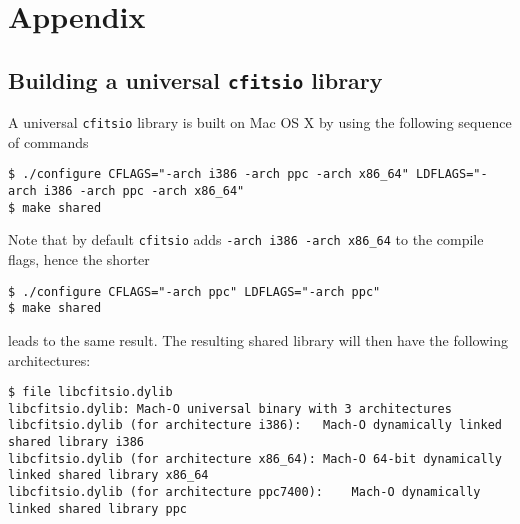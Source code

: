 \documentclass{article}[12pt,a4]
\begin{document}
\section{Appendix}

\subsection{Building a universal {\tt cfitsio} library}

A universal {\tt cfitsio} library is built on Mac OS X by using the following sequence of commands
{\small
\begin{verbatim}
$ ./configure CFLAGS="-arch i386 -arch ppc -arch x86_64" LDFLAGS="-arch i386 -arch ppc -arch x86_64"
$ make shared
\end{verbatim}}
Note that by default {\tt cfitsio} adds {\tt -arch i386 -arch x86\_64} to the compile flags, hence the shorter
{\small
\begin{verbatim}
$ ./configure CFLAGS="-arch ppc" LDFLAGS="-arch ppc"
$ make shared
\end{verbatim}}
leads to the same result.
The resulting shared library will then have the following architectures:
{\small
\begin{verbatim}
$ file libcfitsio.dylib
libcfitsio.dylib: Mach-O universal binary with 3 architectures
libcfitsio.dylib (for architecture i386):	Mach-O dynamically linked shared library i386
libcfitsio.dylib (for architecture x86_64):	Mach-O 64-bit dynamically linked shared library x86_64
libcfitsio.dylib (for architecture ppc7400):	Mach-O dynamically linked shared library ppc
\end{verbatim}}
\end{document}

